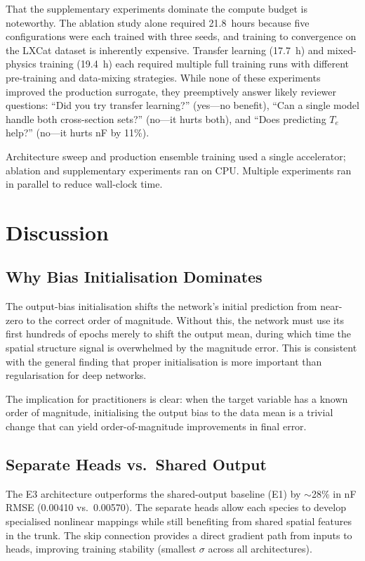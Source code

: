 \documentclass[12pt,a4paper]{article}
\begin{document}
That the supplementary experiments dominate the compute budget is
noteworthy.  The ablation study alone required 21.8~hours because
five configurations were each trained with three seeds, and training
to convergence on the LXCat dataset is inherently expensive.
Transfer learning (17.7~h) and mixed-physics training (19.4~h) each
required multiple full training runs with different pre-training and
data-mixing strategies.  While none of these experiments improved
the production surrogate, they preemptively answer likely reviewer
questions: ``Did you try transfer learning?'' (yes---no benefit),
``Can a single model handle both cross-section sets?'' (no---it
hurts both), and ``Does predicting $T_e$ help?'' (no---it hurts
nF by 11\%).

Architecture sweep and production ensemble training used a single
accelerator; ablation and supplementary experiments ran on CPU.
Multiple experiments ran in parallel to reduce wall-clock time.

\section{Discussion}
\label{sec:discussion}

\subsection{Why Bias Initialisation Dominates}

The output-bias initialisation shifts the network's initial prediction
from near-zero to the correct order of magnitude.  Without this, the
network must use its first hundreds of epochs merely to shift the
output mean, during which time the spatial structure signal is
overwhelmed by the magnitude error.  This is consistent with the
general finding that proper initialisation is more important than
regularisation for deep networks.

The implication for practitioners is clear: when the target variable
has a known order of magnitude, initialising the output bias to the
data mean is a trivial change that can yield order-of-magnitude
improvements in final error.

\subsection{Separate Heads vs.\ Shared Output}

The E3 architecture outperforms the shared-output baseline (E1) by
$\sim$28\% in nF RMSE (0.00410 vs.\ 0.00570).  The separate heads
allow each species to develop specialised nonlinear mappings while
still benefiting from shared spatial features in the trunk.  The
skip connection provides a direct gradient path from inputs to heads,
improving training stability (smallest $\sigma$ across all
architectures).
\end{document}
